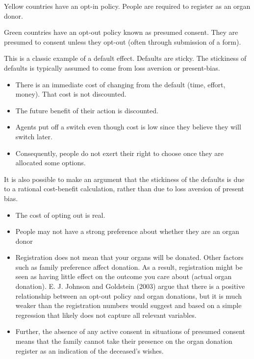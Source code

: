 \documentclass[
  letterpaper,
  DIV=11,
  numbers=noendperiod]{scrreprt}
\begin{document}
Yellow countries have an opt-in policy. People are required to register
as an organ donor.

Green countries have an opt-out policy known as presumed consent. They
are presumed to consent unless they opt-out (often through submission of
a form).

This is a classic example of a default effect. Defaults are sticky. The
stickiness of defaults is typically assumed to come from loss aversion
or present-bias.

\begin{itemize}
\item
  There is an immediate cost of changing from the default (time, effort,
  money). That cost is not discounted.
\item
  The future benefit of their action is discounted.
\item
  Agents put off a switch even though cost is low since they believe
  they will switch later.
\item
  Consequently, people do not exert their right to choose once they are
  allocated some options.
\end{itemize}

It is also possible to make an argument that the stickiness of the
defaults is due to a rational cost-benefit calculation, rather than due
to loss aversion of present bias.

\begin{itemize}
\item
  The cost of opting out is real.
\item
  People may not have a strong preference about whether they are an
  organ donor
\item
  Registration does not mean that your organs will be donated. Other
  factors such as family preference affect donation. As a result,
  registration might be seen as having little effect on the outcome you
  care about (actual organ donation). E. J. Johnson and Goldstein (2003)
  argue that there is a positive relationship between an opt-out policy
  and organ donations, but it is much weaker than the registration
  numbers would suggest and based on a simple regression that likely
  does not capture all relevant variables.
\item
  Further, the absence of any active consent in situations of presumed
  consent means that the family cannot take their presence on the organ
  donation register as an indication of the deceased's wishes.
\end{itemize}
\end{document}
